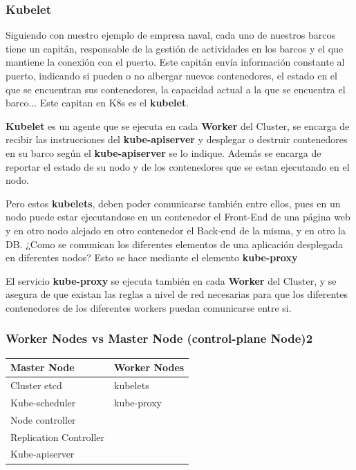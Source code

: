 \documentclass{article}
\begin{document}
\subsubsection{Kubelet}

Siguiendo con nuestro ejemplo de empresa naval, cada uno de nuestros barcos tiene un capitán, responsable de la gestión de actividades en los barcos y el que mantiene la conexión con el puerto. Este capitán envía información constante al puerto, indicando si pueden o no albergar nuevos contenedores, el estado en el que se encuentran sus contenedores, la capacidad actual a la que se encuentra el barco... Este capitan en K8s es el \textbf{kubelet}.

\textbf{Kubelet} es un agente que se ejecuta en cada \textbf{Worker} del Cluster, se encarga de recibir las instrucciones del \textbf{kube-apiserver} y desplegar o destruir contenedores en su barco según el \textbf{kube-apiserver} se lo indique. Además se encarga de reportar el estado de su nodo y de los contenedores que se estan ejecutando en el nodo.

Pero estos \textbf{kubelets}, deben poder comunicarse también entre ellos, pues en un nodo puede estar ejecutandose en un contenedor el Front-End de una página web y en otro nodo alejado en otro contenedor el Back-end de la misma, y en otro la DB. ¿Como se comunican los diferentes elementos de una aplicación desplegada en diferentes nodos? Esto se hace mediante el elemento \textbf{kube-proxy}

 El servicio \textbf{kube-proxy} se ejecuta también en cada \textbf{Worker} del Cluster, y se asegura de que existan las reglas a nivel de red necesarias para que los diferentes contenedores de los diferentes workers puedan comunicarse entre si.

 \subsubsection{Worker Nodes vs Master Node (control-plane Node)2}
\begin{table}[H]
\begin{tabular}{| m{5cm} | m{5cm} |}
\hline
\textbf{Master Node} & \textbf{Worker Nodes} \\ \hline
Cluster etcd & kubelets \\
Kube-scheduler & kube-proxy \\
Node controller & \\
Replication Controller & \\
Kube-apiserver & \\ \hline
\end{tabular}
\end{table}
\end{document}
